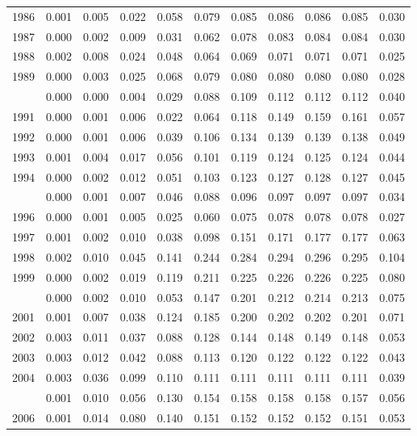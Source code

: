 \documentclass[
]{article}
\begin{document}
\begin{longtable}[t]{lrrrrrrrrrr}
1986 & 0.001 & 0.005 & 0.022 & 0.058 & 0.079 & 0.085 & 0.086 & 0.086 & 0.085 & 0.030\\
1987 & 0.000 & 0.002 & 0.009 & 0.031 & 0.062 & 0.078 & 0.083 & 0.084 & 0.084 & 0.030\\
1988 & 0.002 & 0.008 & 0.024 & 0.048 & 0.064 & 0.069 & 0.071 & 0.071 & 0.071 & 0.025\\
1989 & 0.000 & 0.003 & 0.025 & 0.068 & 0.079 & 0.080 & 0.080 & 0.080 & 0.080 & 0.028\\
\addlinespace
1990 & 0.000 & 0.000 & 0.004 & 0.029 & 0.088 & 0.109 & 0.112 & 0.112 & 0.112 & 0.040\\
1991 & 0.000 & 0.001 & 0.006 & 0.022 & 0.064 & 0.118 & 0.149 & 0.159 & 0.161 & 0.057\\
1992 & 0.000 & 0.001 & 0.006 & 0.039 & 0.106 & 0.134 & 0.139 & 0.139 & 0.138 & 0.049\\
1993 & 0.001 & 0.004 & 0.017 & 0.056 & 0.101 & 0.119 & 0.124 & 0.125 & 0.124 & 0.044\\
1994 & 0.000 & 0.002 & 0.012 & 0.051 & 0.103 & 0.123 & 0.127 & 0.128 & 0.127 & 0.045\\
\addlinespace
1995 & 0.000 & 0.001 & 0.007 & 0.046 & 0.088 & 0.096 & 0.097 & 0.097 & 0.097 & 0.034\\
1996 & 0.000 & 0.001 & 0.005 & 0.025 & 0.060 & 0.075 & 0.078 & 0.078 & 0.078 & 0.027\\
1997 & 0.001 & 0.002 & 0.010 & 0.038 & 0.098 & 0.151 & 0.171 & 0.177 & 0.177 & 0.063\\
1998 & 0.002 & 0.010 & 0.045 & 0.141 & 0.244 & 0.284 & 0.294 & 0.296 & 0.295 & 0.104\\
1999 & 0.000 & 0.002 & 0.019 & 0.119 & 0.211 & 0.225 & 0.226 & 0.226 & 0.225 & 0.080\\
\addlinespace
2000 & 0.000 & 0.002 & 0.010 & 0.053 & 0.147 & 0.201 & 0.212 & 0.214 & 0.213 & 0.075\\
2001 & 0.001 & 0.007 & 0.038 & 0.124 & 0.185 & 0.200 & 0.202 & 0.202 & 0.201 & 0.071\\
2002 & 0.003 & 0.011 & 0.037 & 0.088 & 0.128 & 0.144 & 0.148 & 0.149 & 0.148 & 0.053\\
2003 & 0.003 & 0.012 & 0.042 & 0.088 & 0.113 & 0.120 & 0.122 & 0.122 & 0.122 & 0.043\\
2004 & 0.003 & 0.036 & 0.099 & 0.110 & 0.111 & 0.111 & 0.111 & 0.111 & 0.111 & 0.039\\
\addlinespace
2005 & 0.001 & 0.010 & 0.056 & 0.130 & 0.154 & 0.158 & 0.158 & 0.158 & 0.157 & 0.056\\
2006 & 0.001 & 0.014 & 0.080 & 0.140 & 0.151 & 0.152 & 0.152 & 0.152 & 0.151 & 0.053\\

\end{longtable}
\end{document}
